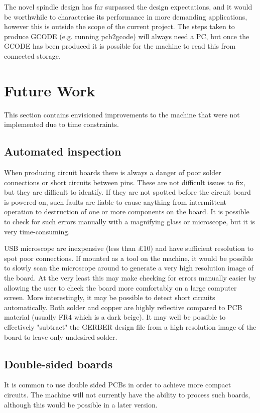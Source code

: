 The novel spindle design has far surpassed the design expectations, and it
would be worthwhile to characterise its performance in more demanding applications,
however this is outside the scope of the current project.
The steps taken to produce GCODE (e.g. running pcb2gcode) will always need a PC, but once the GCODE has been produced it is possible for the machine to read this from connected storage.

\section{Future Work}
This section contains envisioned improvements to the machine that were not implemented due to time constraints.

\subsection{Automated inspection}
When producing circuit boards there is always a danger of poor solder 
connections or short circuits between pins. These are not difficult issues
to fix, but they are difficult to identify. If they are not spotted
before the circuit board is powered on, such faults are liable to cause
anything from intermittent operation to destruction of one or more
components on the board. It is possible to check for such errors manually
with a magnifying glass or microscope, but it is very time-consuming.

USB microscope are inexpensive (less than \pounds 10) and have sufficient
resolution to spot poor connections. If mounted as a tool on the machine,
it would be possible to slowly scan the microscope around to generate
a very high resolution image of the board. At the very least this may
make checking for errors manually easier by allowing the user to check
the board more comfortably on a large computer screen. More interestingly,
it may be possible to detect short circuits automatically. Both solder 
and copper are highly reflective compared to PCB material (usually FR4 which
is a dark beige). It may well be possible to effectively "subtract" the
GERBER design file from a high resolution image of the board to leave
only undesired solder. 


\subsection{Double-sided boards}
It is common to use double sided PCBs in order to achieve more compact circuits. The machine will not currently have the ability to process such boards, although this would be possible in a later version.

